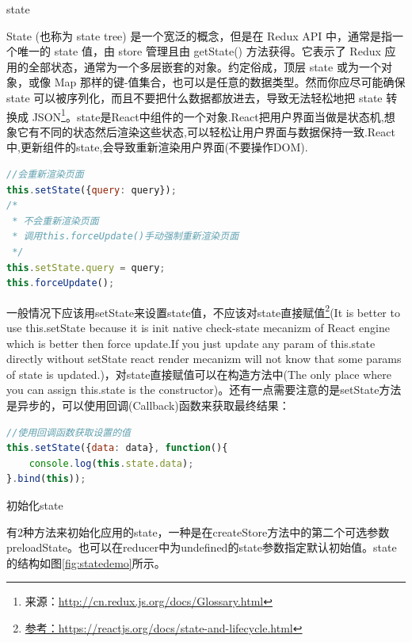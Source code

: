 \documentclass[12pt]{book}
\makeatletter
\numberwithin{dummy}{section}
\theoremstyle{ocrenumbox}
\theoremstyle{blacknumex}
\theoremstyle{blacknumbox}
\theoremstyle{ocrenum}
\renewcommand{\subsection}{\@startsection {subsection}{2}{\z@}
	{-3ex \@plus -0.1ex \@minus -.4ex}
	{0.5ex \@plus.2ex }
	{\normalfont\sffamily\bfseries}}
\renewcommand\paragraph{\@startsection{paragraph}{4}{\z@}
	{-2ex \@plus-.2ex \@minus .2ex}
	{.1ex}
	{\normalfont\small\sffamily\bfseries}}
\makeatother
\begin{document}
\subsection{state}

State (也称为 state tree) 是一个宽泛的概念，但是在 Redux API 中，通常是指一个唯一的 state 值，由 store 管理且由 getState() 方法获得。它表示了 Redux 应用的全部状态，通常为一个多层嵌套的对象。约定俗成，顶层 state 或为一个对象，或像 Map 那样的键-值集合，也可以是任意的数据类型。然而你应尽可能确保 state 可以被序列化，而且不要把什么数据都放进去，导致无法轻松地把 state 转换成 JSON\footnote{来源：\url{http://cn.redux.js.org/docs/Glossary.html}}。state是React中组件的一个对象.React把用户界面当做是状态机,想象它有不同的状态然后渲染这些状态,可以轻松让用户界面与数据保持一致.React中,更新组件的state,会导致重新渲染用户界面(不要操作DOM).

\begin{lstlisting}[language=Javascript]
//会重新渲染页面
this.setState({query: query});
/*
 * 不会重新渲染页面
 * 调用this.forceUpdate()手动强制重新渲染页面
 */
this.setState.query = query;
this.forceUpdate();
\end{lstlisting}

一般情况下应该用setState来设置state值，不应该对state直接赋值\footnote{\url{参考：https://reactjs.org/docs/state-and-lifecycle.html}}(It is better to use this.setState because it is init native check-state mecanizm of React engine which is better then force update.If you just update any param of this.state directly without setState react render mecanizm will not know that some params of state is updated.)，对state直接赋值可以在构造方法中(The only place where you can assign this.state is the constructor)。还有一点需要注意的是setState方法是异步的，可以使用回调(Callback)函数来获取最终结果：

\begin{lstlisting}[language=Javascript]
//使用回调函数获取设置的值
this.setState({data: data}, function(){
	console.log(this.state.data);
}.bind(this));
\end{lstlisting}

\paragraph{初始化state}

有2种方法来初始化应用的state，一种是在createStore方法中的第二个可选参数preloadState。也可以在reducer中为undefined的state参数指定默认初始值。state的结构如图\ref{fig:statedemo}所示。
\end{document}
